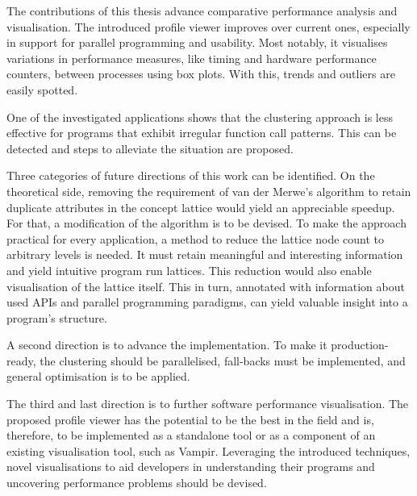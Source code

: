 \documentclass[a4paper, final, diplominf]{zih-template}
\begin{document}
The contributions of this thesis advance comparative performance analysis and visualisation.
The introduced profile viewer improves over current ones, especially in support for parallel programming and usability.
Most notably, it visualises variations in performance measures, like timing and hardware performance counters, between processes using box plots.
With this, trends and outliers are easily spotted.

One of the investigated applications shows that the clustering approach is less effective for programs that exhibit irregular function call patterns.
This can be detected and steps to alleviate the situation are proposed.

Three categories of future directions of this work can be identified.
On the theoretical side, removing the requirement of van der Merwe's algorithm to retain duplicate attributes in the concept lattice would yield an appreciable speedup.
For that, a modification of the algorithm is to be devised.
To make the approach practical for every application, a method to reduce the lattice node count to arbitrary levels is needed.
It must retain meaningful and interesting information and yield intuitive program run lattices.
This reduction would also enable visualisation of the lattice itself.
This in turn, annotated with information about used APIs and parallel programming paradigms, can yield valuable insight into a program's structure.

A second direction is to advance the implementation.
To make it production-ready, the clustering should be parallelised, fall-backs must be implemented, and general optimisation is to be applied.

The third and last direction is to further software performance visualisation.
The proposed profile viewer has the potential to be the best in the field and is, therefore, to be implemented as a standalone tool or as a component of an existing visualisation tool, such as Vampir.
Leveraging the introduced techniques, novel visualisations to aid developers in understanding their programs and uncovering performance problems should be devised.

\end{document}
